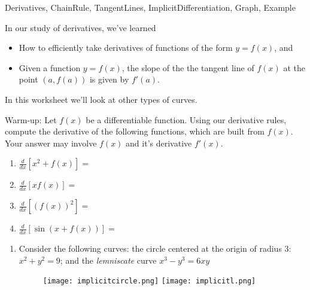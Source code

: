 	
\begin{tagblock}{Derivatives, ChainRule, TangentLines, ImplicitDifferentiation, Graph, Example}
\begin{question}
	

 In our study of derivatives, we've learned
\begin{itemize}
\item How to efficiently take derivatives of functions of the form $y=f(x)$, and
\item Given a function $y=f(x)$, the slope of the the tangent line of $f(x)$ at the point $(a,f(a))$ is given by $f'(a)$.
\end{itemize}


In this worksheet we'll look at other types of curves.  

\bigskip

Warm-up: Let $f(x)$ be a differentiable function.  Using our derivative rules, compute the derivative of the following functions, which are built from $f(x)$.  Your answer may involve $f(x)$ and it's derivative $f'(x)$.  
\begin{enumerate}
\item $\displaystyle \frac{d}{dx}[x^2 + f(x) ] = $
\vspace{.25in}

\item $\displaystyle \frac{d}{dx}[xf(x) ] = $
\vspace{.25in}

\item $\displaystyle \frac{d}{dx}[(f(x))^2 ] = $
\vspace{.25in}

\item $\displaystyle \frac{d}{dx}[\sin(x + f(x) )] = $

\end{enumerate}
\vspace{.3in}

\bigskip

\begin{enumerate}

\item Consider the following curves: the circle centered at the origin of radius $3$:  $x^2+y^2 = 9$; and the \emph{lemniscate} curve $x^3-y^3=6xy$

\begin{figure}[h]
\texttt{[image: implicitcircle.png]} \hfill \texttt{[image: implicitl.png]}


\end{figure}
\end{enumerate}
\end{question}
\end{tagblock}

